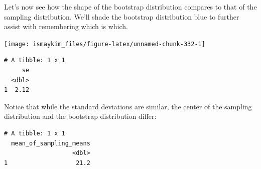 \documentclass[12pt,]{krantz}
\makeatletter
\newenvironment{Shaded}{\begin{snugshade}}{\end{snugshade}}
\newcommand{\KeywordTok}[1]{\textcolor[rgb]{0.27,0.27,0.27}{\textbf{#1}}}
\newcommand{\DataTypeTok}[1]{\textcolor[rgb]{0.27,0.27,0.27}{#1}}
\newcommand{\DecValTok}[1]{\textcolor[rgb]{0.06,0.06,0.06}{#1}}
\newcommand{\StringTok}[1]{\textcolor[rgb]{0.5,0.5,0.5}{#1}}
\newcommand{\OperatorTok}[1]{\textcolor[rgb]{0.43,0.43,0.43}{\textbf{#1}}}
\newcommand{\NormalTok}[1]{#1}
\newenvironment{kframe}{%
\medskip{}
\setlength{\fboxsep}{.8em}
 \def\at@end@of@kframe{}%
 \ifinner\ifhmode%
  \def\at@end@of@kframe{\end{minipage}}%
  \begin{minipage}{\columnwidth}%
 \fi\fi%
 \def\FrameCommand##1{\hskip\@totalleftmargin \hskip-\fboxsep
 \colorbox{shadecolor}{##1}\hskip-\fboxsep
     \hskip-\linewidth \hskip-\@totalleftmargin \hskip\columnwidth}%
 \MakeFramed {\advance\hsize-\width
   \@totalleftmargin\z@ \linewidth\hsize
   \@setminipage}}%
 {\par\unskip\endMakeFramed%
 \at@end@of@kframe}
\renewenvironment{Shaded}{\begin{kframe}}{\end{kframe}}
\makeatother
\begin{document}
Let's now see how the shape of the bootstrap distribution compares to
that of the sampling distribution. We'll shade the bootstrap
distribution blue to further assist with remembering which is which.

\begin{Shaded}
\end{Shaded}

\begin{center}\texttt{[image: ismaykim\_files/figure-latex/unnamed-chunk-332-1]} \end{center}

\begin{Shaded}
\end{Shaded}

\begin{verbatim}
# A tibble: 1 x 1
     se
  <dbl>
1  2.12
\end{verbatim}

Notice that while the standard deviations are similar, the center of the
sampling distribution and the bootstrap distribution differ:

\begin{Shaded}
\end{Shaded}

\begin{verbatim}
# A tibble: 1 x 1
  mean_of_sampling_means
                   <dbl>
1                   21.2
\end{verbatim}

\begin{Shaded}
\end{Shaded}
\end{document}
